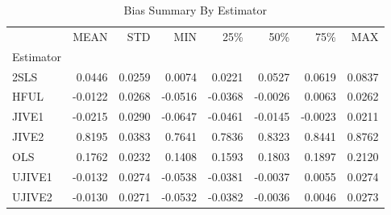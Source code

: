 \begin{table}[ht]
\centering
\caption{Bias Summary By Estimator}
\begin{tabular}{lrrrrrrr}
\toprule
 & MEAN & STD & MIN & 25\% & 50\% & 75\% & MAX \\
Estimator &  &  &  &  &  &  &  \\
\midrule
2SLS & 0.0446 & 0.0259 & 0.0074 & 0.0221 & 0.0527 & 0.0619 & 0.0837 \\
HFUL & -0.0122 & 0.0268 & -0.0516 & -0.0368 & -0.0026 & 0.0063 & 0.0262 \\
JIVE1 & -0.0215 & 0.0290 & -0.0647 & -0.0461 & -0.0145 & -0.0023 & 0.0211 \\
JIVE2 & 0.8195 & 0.0383 & 0.7641 & 0.7836 & 0.8323 & 0.8441 & 0.8762 \\
OLS & 0.1762 & 0.0232 & 0.1408 & 0.1593 & 0.1803 & 0.1897 & 0.2120 \\
UJIVE1 & -0.0132 & 0.0274 & -0.0538 & -0.0381 & -0.0037 & 0.0055 & 0.0274 \\
UJIVE2 & -0.0130 & 0.0271 & -0.0532 & -0.0382 & -0.0036 & 0.0046 & 0.0273 \\
\bottomrule
\end{tabular}
\end{table}
